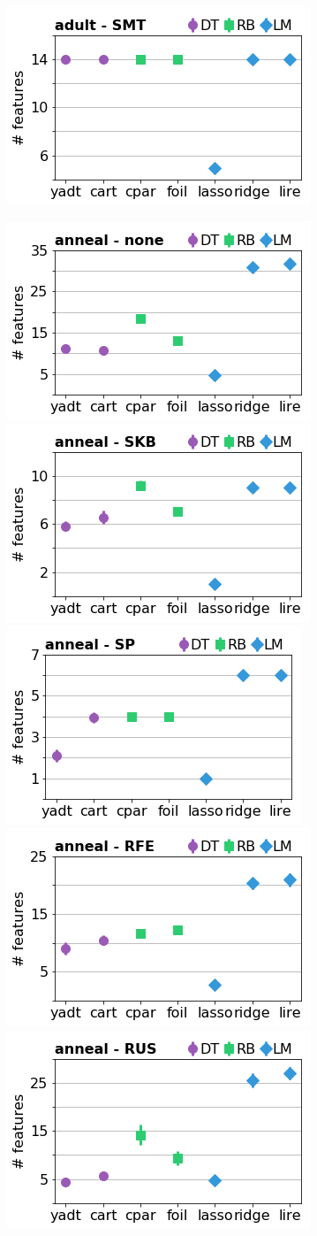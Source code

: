 \documentclass[runningheads,a4paper]{llncs}
\begin{document}
\begin{figure}[!h]
\includegraphics[width=0.32\linewidth]{fig/models_adult_SMT_nbr_features.png}
\end{figure}

\begin{figure}[!h]
\includegraphics[width=0.32\linewidth]{fig/models_anneal_none_nbr_features.png}\\
\includegraphics[width=0.32\linewidth]{fig/models_anneal_SKB_nbr_features.png}
\includegraphics[width=0.32\linewidth]{fig/models_anneal_SP_nbr_features.png}
\includegraphics[width=0.32\linewidth]{fig/models_anneal_RFE_nbr_features.png}
\includegraphics[width=0.32\linewidth]{fig/models_anneal_RUS_nbr_features.png}

\end{figure}
\end{document}

